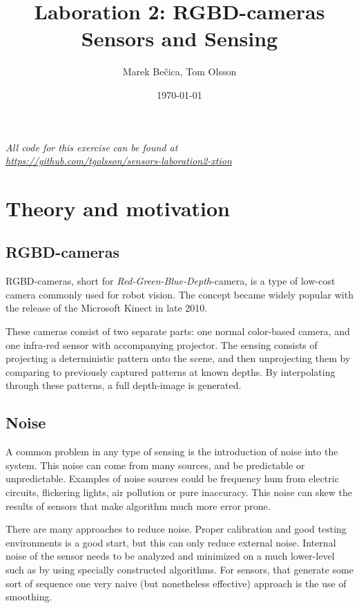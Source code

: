 \documentclass[11pt]{article}
\title{Laboration 2: RGBD-cameras\\ {\small Sensors and Sensing}}
\author{Marek Bečica, Tom Olsson}
\date{\today}
\begin{document}
\maketitle %
\begin{center}
  \emph{All code for this exercise can be found at \\ \url{https://github.com/tgolsson/sensors-laboration2-xtion}}
\end{center}
\tableofcontents
\lstlistoflistings %
\listoffigures %
\listoftables
\lstset{ matchrangestart=t} %
\section{Theory and motivation}
\subsection{RGBD-cameras}

RGBD-cameras, short for \emph{Red-Green-Blue-Depth}-camera, is a type of low-cost camera commonly used for robot vision. The concept became widely popular with the release of the Microsoft Kinect in late 2010. \par

These cameras consist of two separate parts: one normal color-based camera, and one infra-red sensor with accompanying projector. The sensing consists of projecting a deterministic pattern onto the scene, and then unprojecting them by comparing to previously captured patterns at known depths. By interpolating through these patterns, a full depth-image is generated.  
\subsection{Noise}
A common problem in any type of sensing is the introduction of noise into the system. This noise can come from many sources, and be predictable or unpredictable. Examples of noise sources could be frequency hum from electric circuits, flickering lights, air pollution or pure inaccuracy. This noise can skew the results of sensors that make algorithm much more error prone. \par

There are many approaches to reduce noise. Proper calibration and good testing environments is a good start, but this can only reduce external noise. Internal noise of the sensor needs to be analyzed and minimized on a much lower-level such as by using specially constructed algorithms. For sensors, that generate some sort of sequence one very naive (but nonetheless effective) approach is the use of smoothing. \par
\end{document}
